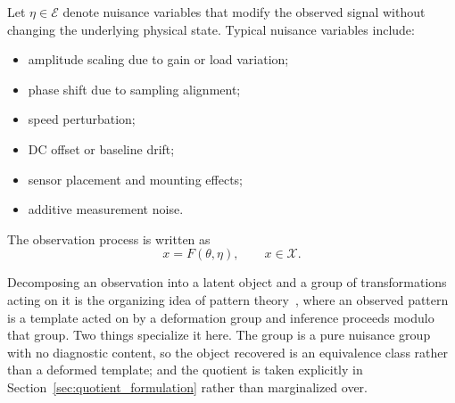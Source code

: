 \documentclass[a4paper]{cas-sc}
\newcommand{\X}{\ensuremath{\mathcal{X}}}
\newcommand{\EtaSpace}{\ensuremath{\mathcal{E}}}
\begin{document}
Let \(\eta \in \EtaSpace\) denote nuisance variables that modify the
observed signal without changing the underlying physical state. Typical
nuisance variables include:

\begin{itemize}[leftmargin=1.5em]
    \item amplitude scaling due to gain or load variation;
    \item phase shift due to sampling alignment;
    \item speed perturbation;
    \item DC offset or baseline drift;
    \item sensor placement and mounting effects;
    \item additive measurement noise.
\end{itemize}

The observation process is written as
\begin{equation}
    x = F(\theta,\eta), \qquad x \in \X .
    \label{eq:forward_model}
\end{equation}

Decomposing an observation into a latent object and a group of
transformations acting on it is the organizing idea of pattern
theory~\citep{grenander1994}, where an observed pattern is a template acted on
by a deformation group and inference proceeds modulo that group. Two things
specialize it here. The group is a pure nuisance group with no diagnostic
content, so the object recovered is an equivalence class rather than a
deformed template; and the quotient is taken explicitly in
Section~\ref{sec:quotient_formulation} rather than marginalized over.
\end{document}
